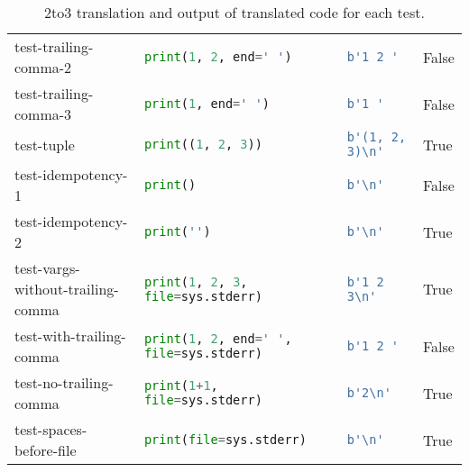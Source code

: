 \begin{table}[h!]
\begin{tabular}{@{}l|lll@{}}
    test-trailing-comma-2              & \lstinline[language=Python, style=pythonstyle]|print(1, 2, end=' ')                 | & \lstinline[language=Python, style=pythonstyle]|b'1 2 '  |                              & False               \\
    test-trailing-comma-3              & \lstinline[language=Python, style=pythonstyle]|print(1, end=' ')                    | & \lstinline[language=Python, style=pythonstyle]|b'1 '        |                          & False               \\
    test-tuple                           & \lstinline[language=Python, style=pythonstyle]|print((1, 2, 3))                     | & \lstinline[language=Python, style=pythonstyle]|b'(1, 2, 3)\n'  |        & True                \\
    test-idempotency-1                  & \lstinline[language=Python, style=pythonstyle]|print()                              | & \lstinline[language=Python, style=pythonstyle]|b'\n'     |              & False               \\
    test-idempotency-2                  & \lstinline[language=Python, style=pythonstyle]|print('')                            | & \lstinline[language=Python, style=pythonstyle]|b'\n'        |           & True                \\
    test-vargs-without-trailing-comma & \lstinline[language=Python, style=pythonstyle]|print(1, 2, 3, file=sys.stderr)      | & \lstinline[language=Python, style=pythonstyle]|b'1 2 3\n'  |            & True                \\
    test-with-trailing-comma           & \lstinline[language=Python, style=pythonstyle]|print(1, 2, end=' ', file=sys.stderr)| & \lstinline[language=Python, style=pythonstyle]|b'1 2 '    |                            & False               \\
    test-no-trailing-comma             & \lstinline[language=Python, style=pythonstyle]|print(1+1, file=sys.stderr)          | & \lstinline[language=Python, style=pythonstyle]|b'2\n'    |             & True                \\
    test-spaces-before-file            & \lstinline[language=Python, style=pythonstyle]|print(file=sys.stderr)               | & \lstinline[language=Python, style=pythonstyle]|b'\n'   |                & True                \\ \bottomrule
    \end{tabular}
    \caption{2to3 translation and output of translated code for each test.}
    \label{table:2to3-accuracy}
\end{table}

